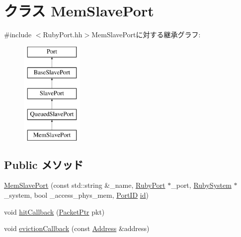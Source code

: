 \hypertarget{classRubyPort_1_1MemSlavePort}{
\section{クラス MemSlavePort}
\label{classRubyPort_1_1MemSlavePort}
}


{\ttfamily \#include $<$RubyPort.hh$>$}MemSlavePortに対する継承グラフ:\begin{figure}[H]
\begin{center}
\leavevmode
\includegraphics[height=5cm]{classRubyPort_1_1MemSlavePort}
\end{center}
\end{figure}
\subsection*{Public メソッド}
\begin{DoxyCompactItemize}
\item 
\hyperlink{classRubyPort_1_1MemSlavePort_a898fd995c2b8563d692931dc72e50010}{MemSlavePort} (const std::string \&\_\-name, \hyperlink{classRubyPort}{RubyPort} $\ast$\_\-port, \hyperlink{classRubySystem}{RubySystem} $\ast$\_\-system, bool \_\-access\_\-phys\_\-mem, \hyperlink{base_2types_8hh_acef4d7d41cb21fdc252e20c04cd7bb8e}{PortID} \hyperlink{classPort_a0a67444fc1c33a60fe4a92bfff05d0cb}{id})
\item 
void \hyperlink{classRubyPort_1_1MemSlavePort_a24a8f9c1806a15d53eddd6a70d9b3e31}{hitCallback} (\hyperlink{classPacket}{PacketPtr} pkt)
\item 
void \hyperlink{classRubyPort_1_1MemSlavePort_a3af79aeefd596a230ebc3a579fcc3fb1}{evictionCallback} (const \hyperlink{classAddress}{Address} \&address)
\end{DoxyCompactItemize}
